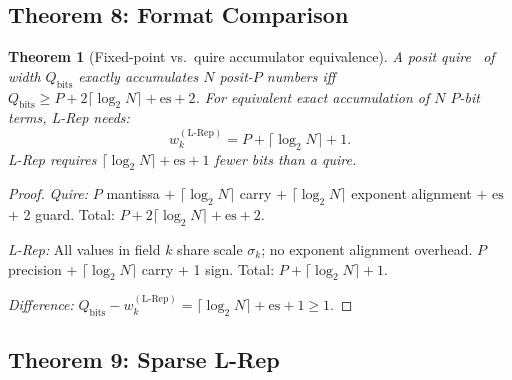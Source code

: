 \documentclass[11pt,a4paper]{article}
\theoremstyle{definition}
\theoremstyle{plain}
\newtheorem{theorem}{Theorem}[section]
\theoremstyle{remark}
\begin{document}
\subsection{Theorem 8: Format Comparison}
\label{sec:format}

\begin{theorem}[Fixed-point vs.\ quire accumulator equivalence]
\label{thm:format}
A posit quire~\cite{gustafson2017} of width $Q_\mathrm{bits}$ exactly
accumulates $N$ posit-$P$ numbers iff
$Q_\mathrm{bits}\ge P+2\lceil\log_2 N\rceil+\mathrm{es}+2$.
For equivalent exact accumulation of $N$ $P$-bit terms, L-Rep needs:
\begin{equation}\label{eq:quire-equiv}
  w_k^{(\mathrm{L\text{-}Rep})}=P+\lceil\log_2 N\rceil+1.
\end{equation}
L-Rep requires $\lceil\log_2 N\rceil+\mathrm{es}+1$ fewer bits than
a quire.
\end{theorem}

\begin{proof}
\emph{Quire:} $P$ mantissa + $\lceil\log_2 N\rceil$ carry +
$\lceil\log_2 N\rceil$ exponent alignment + $\mathrm{es}$ + 2 guard.
Total: $P+2\lceil\log_2 N\rceil+\mathrm{es}+2$.

\emph{L-Rep:} All values in field $k$ share scale $\sigma_k$; no
exponent alignment overhead.
$P$ precision + $\lceil\log_2 N\rceil$ carry + 1 sign.
Total: $P+\lceil\log_2 N\rceil+1$.

\emph{Difference:} $Q_\mathrm{bits}-w_k^{(\mathrm{L\text{-}Rep})}=\lceil\log_2 N\rceil+\mathrm{es}+1\ge1$.
\end{proof}

\subsection{Theorem 9: Sparse L-Rep}
\label{sec:sparse}
\end{document}
